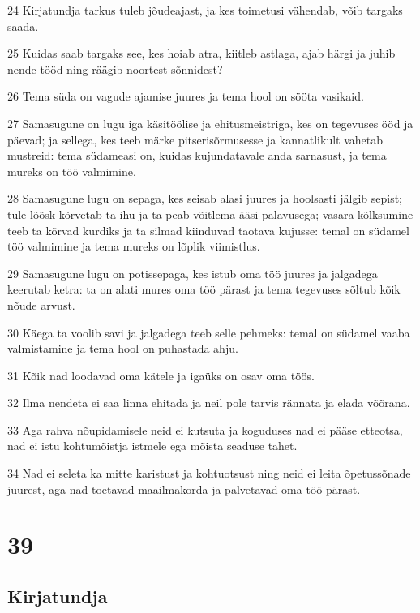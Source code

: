 \par 24 Kirjatundja tarkus tuleb jõudeajast, ja kes toimetusi vähendab, võib targaks saada.
\par 25 Kuidas saab targaks see, kes hoiab atra, kiitleb astlaga, ajab härgi ja juhib nende tööd ning räägib noortest sõnnidest?
\par 26 Tema süda on vagude ajamise juures ja tema hool on sööta vasikaid.
\par 27 Samasugune on lugu iga käsitöölise ja ehitusmeistriga, kes on tegevuses ööd ja päevad; ja sellega, kes teeb märke pitserisõrmusesse ja kannatlikult vahetab mustreid: tema südameasi on, kuidas kujundatavale anda sarnasust, ja tema mureks on töö valmimine.
\par 28 Samasugune lugu on sepaga, kes seisab alasi juures ja hoolsasti jälgib sepist; tule lõõsk kõrvetab ta ihu ja ta peab võitlema ääsi palavusega; vasara kõlksumine teeb ta kõrvad kurdiks ja ta silmad kiinduvad taotava kujusse: temal on südamel töö valmimine ja tema mureks on lõplik viimistlus.
\par 29 Samasugune lugu on potissepaga, kes istub oma töö juures ja jalgadega keerutab ketra: ta on alati mures oma töö pärast ja tema tegevuses sõltub kõik nõude arvust.
\par 30 Käega ta voolib savi ja jalgadega teeb selle pehmeks: temal on südamel vaaba valmistamine ja tema hool on puhastada ahju.
\par 31 Kõik nad loodavad oma kätele ja igaüks on osav oma töös.
\par 32 Ilma nendeta ei saa linna ehitada ja neil pole tarvis rännata ja elada võõrana.
\par 33 Aga rahva nõupidamisele neid ei kutsuta ja koguduses nad ei pääse etteotsa, nad ei istu kohtumõistja istmele ega mõista seaduse tahet.
\par 34 Nad ei seleta ka mitte karistust ja kohtuotsust ning neid ei leita õpetussõnade juurest, aga nad toetavad maailmakorda ja palvetavad oma töö pärast.

\chapter{39}

\section*{Kirjatundja}


